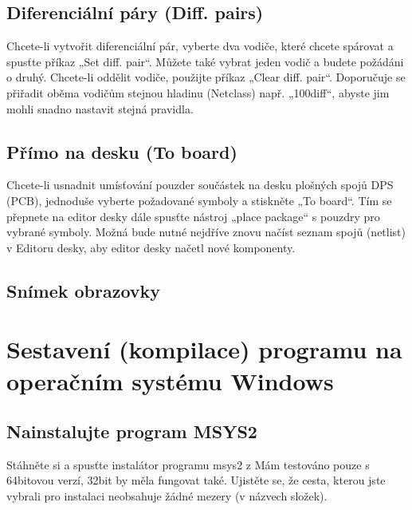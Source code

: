 \documentclass[letterpaper,10pt,czech]{sphinxmanual}
\begin{document}
\section{Diferenciální páry (Diff. pairs)}
\label{\detokenize{imp-sch_cz:diferencialni-pary-diff-pairs}}\label{\detokenize{imp-sch_cz:diferencialni-pary}}
Chcete-li vytvořit diferenciální pár, vyberte dva vodiče, které chcete spárovat a spusťte příkaz „Set diff. pair“. Můžete také vybrat jeden vodič a budete požádáni o druhý. Chcete-li oddělit vodiče, použijte příkaz „Clear diff. pair“. Doporučuje se přiřadit oběma vodičům stejnou hladinu (Netclass) např. „100diff“, abyste jim mohli snadno nastavit stejná pravidla.


\section{Přímo na desku (To board)}
\label{\detokenize{imp-sch_cz:primo-na-desku-to-board}}
Chcete-li usnadnit umísťování pouzder součástek na desku plošných spojů DPS (PCB), jednoduše vyberte
požadované symboly a stiskněte „To board“. Tím se přepnete na editor desky dále spusťte nástroj „place package“ s pouzdry pro vybrané symboly. Možná bude nutné nejdříve znovu načíst seznam spojů (netlist) v Editoru desky, aby editor desky načetl nové komponenty.


\section{Snímek obrazovky}
\label{\detokenize{imp-sch_cz:snimek-obrazovky}}
\begin{figure}[htbp]
\centering

\noindent{}
\end{figure}


\chapter{Sestavení (kompilace) programu na operačním systému Windows}
\label{\detokenize{build-win32_cz:sestaveni-kompilace-programu-na-operacnim-systemu-windows}}\label{\detokenize{build-win32_cz::doc}}

\section{Nainstalujte program MSYS2}
\label{\detokenize{build-win32_cz:nainstalujte-program-msys2}}
Stáhněte si a spusťte instalátor programu msys2 z  Mám
testováno pouze s 64bitovou verzí, 32bit by měla fungovat také. Ujistěte se, že cesta, kterou jste vybrali pro instalaci neobsahuje žádné mezery (v názvech složek).
\end{document}
